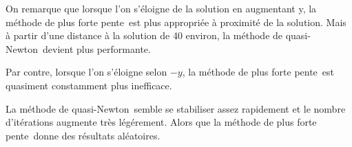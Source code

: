 \documentclass[11pt,a4paper,twoside,onecolumn,titlepage]{report}
\newcommand{\qn}{quasi-Newton}
\newcommand{\pfp}{plus forte pente}
\begin{document}
\begin{enumerate}[(a)]
On remarque que lorsque l'on s'éloigne de la solution en augmentant y, la méthode de \pfp\ est plus appropriée à proximité de la solution. Mais à partir d'une distance à la solution de 40 environ, la méthode de \qn\ devient plus performante.

Par contre, lorsque l'on s'éloigne selon $-y$, la méthode de \pfp\ est quasiment constamment plus inefficace.

La méthode de \qn\ semble se stabiliser assez rapidement et le nombre d'itérations augmente très légérement. Alors que la méthode de \pfp\ donne des résultats aléatoires.


\end{enumerate}
\end{document}
